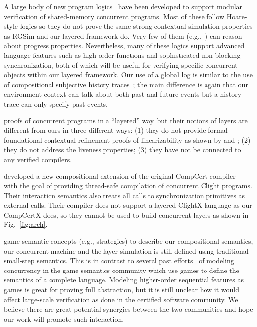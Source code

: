  A large body of new program
 logics~\cite{ohearn:concur04,brookes:concur04,feng07:sagl,vafeiadis:marriage,LRG,verifast,gotsman13,Turon13popl,Turon13icfp,nanevski13,nanevski14,sergey15,sergey15pldi,pinto14,iris15,civl15,pinto16,xu16}
 have been developed to support modular verification of shared-memory
 concurrent programs. Most of these follow Hoare-style logics so they
 do not prove the same strong contextual simulation properties as RGSim
 and our layered framework do. Very few of them (e.g.,~\cite{pinto16})
 can reason about progress properties. Nevertheless, many of these
 logics support advanced language features such as high-order functions
 and sophisticated non-blocking synchronization, both of which will be
 useful for verifying specific concurrent objects within our layered
 framework. Our use of a global log is similar to the use of compositional
 subjective history traces~\cite{sergey15}; the main difference is
 again that our environment context can talk about both past and future
 events but a history trace can only specify past events.

 proofs of concurrent programs in a ``layered'' way, but their notions
 of layers are different from ours in three different ways: (1) they do
 not provide formal foundational contextual refinement proofs of
 linearizability as shown by \cite{filipovic10} and \cite{liang13};
 (2) they do not address the liveness properties; (3) they have not be
 connected to any verified compilers.

\cite{stewart15} developed a new compositional extension of the
original CompCert compiler~\cite{compcert} with the goal of providing
thread-safe compilation of concurrent Clight programs.  Their
interaction semantics also treats all calls to synchronization
primitives as external calls. Their compiler does not support a layered
ClightX language as our CompCertX does, so they cannot be used
to build concurrent layers as shown in Fig.~\ref{fig:arch}. 

 game-semantic concepts (e.g., strategies) to describe our
 compositional semantics, our concurrent machine and the layer simulation is still defined using
 traditional small-step semantics.  This is in contrast to several past
 efforts~\cite{ghica08,nishimura13,rideau11,abramsky99} of modeling
 concurrency in the game semantics community which use games to
 define the semantics of a complete language. Modeling higher-order
 sequential features as games is great for proving full abstraction,
 but it is still unclear how it would affect large-scale
 verification as done in the certified software community.  We
 believe there are great potential synergies between the two communities
 and hope our work will promote such interaction.

